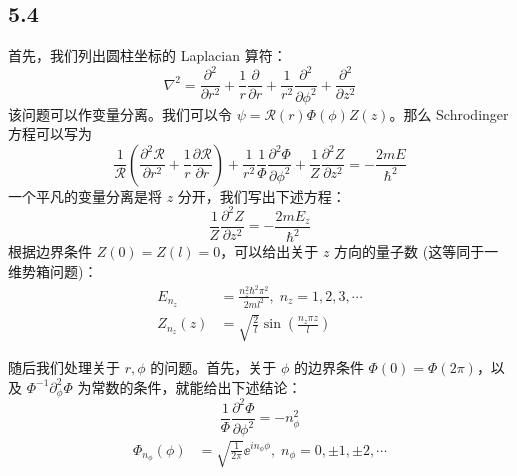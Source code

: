 \subsection{5.4}
首先，我们列出圆柱坐标的 Laplacian 算符：
\begin{equation}
\nabla^2 = \frac{\partial^2}{\partial r^2} + \frac{1}{r} \frac{\partial}{\partial r} + \frac{1}{r^2} \frac{\partial^2}{\partial \phi^2} + \frac{\partial^2}{\partial z^2}
\end{equation}
该问题可以作变量分离。我们可以令 $\psi = \mathcal{R}(r) \Phi(\phi) Z(z)$。那么 Schrodinger 方程可以写为
\begin{equation}
\frac{1}{\mathcal{R}} \left( \frac{\partial^2 \mathcal{R}}{\partial r^2} + \frac{1}{r} \frac{\partial \mathcal{R}}{\partial r} \right) + \frac{1}{r^2} \frac{1}{\Phi} \frac{\partial^2 \Phi}{\partial \phi^2} + \frac{1}{Z} \frac{\partial^2 Z}{\partial z^2} = - \frac{2 m E}{\hbar^2}
\end{equation}
一个平凡的变量分离是将 $z$ 分开，我们写出下述方程：
\begin{equation}
\frac{1}{Z} \frac{\partial^2 Z}{\partial z^2} = - \frac{2 m E_z}{\hbar^2}
\end{equation}
根据边界条件 $Z(0) = Z(l) = 0$，可以给出关于 $z$ 方向的量子数 (这等同于一维势箱问题)：
\begin{align}
E_{n_z} &= \frac{n_z^2 \hbar^2 \pi^2}{2 m l^2},\; n_z = 1, 2, 3, \cdots \\
Z_{n_z} (z) &= \sqrt{\frac{2}{l}} \sin \left( \frac{n_z \pi z}{l} \right)
\end{align}

随后我们处理关于 $r, \phi$ 的问题。首先，关于 $\phi$ 的边界条件 $\Phi(0) = \Phi(2 \pi)$，以及 $\Phi^{-1} \partial_\phi^2 \Phi$ 为常数的条件，就能给出下述结论：
\begin{equation}
\frac{1}{\Phi} \frac{\partial^2 \Phi}{\partial \phi^2} = - n_\phi^2
\end{equation}
\begin{align}
\Phi_{n_\phi} (\phi) &= \sqrt{\frac{1}{2\pi}} \ee^{i n_\phi \phi},\; n_\phi = 0, \pm 1, \pm 2, \cdots
\end{align}


